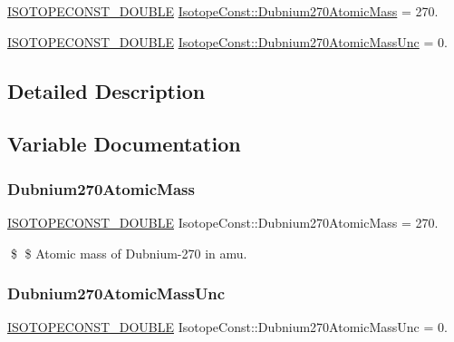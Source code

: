 \begin{DoxyCompactItemize}
\item 
\mbox{\hyperlink{group___isotope_const-_macros_ga8f45a7272ce02c0b4c65c44636ed719a}{I\+S\+O\+T\+O\+P\+E\+C\+O\+N\+S\+T\+\_\+\+D\+O\+U\+B\+LE}} \mbox{\hyperlink{group___isotope_const-_dubnium-_db270_ga77f52fcce5a9e6da48cd60d72c65bba9}{Isotope\+Const\+::\+Dubnium270\+Atomic\+Mass}} = 270.
\item 
\mbox{\hyperlink{group___isotope_const-_macros_ga8f45a7272ce02c0b4c65c44636ed719a}{I\+S\+O\+T\+O\+P\+E\+C\+O\+N\+S\+T\+\_\+\+D\+O\+U\+B\+LE}} \mbox{\hyperlink{group___isotope_const-_dubnium-_db270_gac33462755af727dd64585b9a19922437}{Isotope\+Const\+::\+Dubnium270\+Atomic\+Mass\+Unc}} = 0.
\end{DoxyCompactItemize}


\subsection{Detailed Description}


\subsection{Variable Documentation}
\mbox{\label{group___isotope_const-_dubnium-_db270_ga77f52fcce5a9e6da48cd60d72c65bba9}} 
\subsubsection{\texorpdfstring{Dubnium270\+Atomic\+Mass}{Dubnium270AtomicMass}}
{\footnotesize\ttfamily \mbox{\hyperlink{group___isotope_const-_macros_ga8f45a7272ce02c0b4c65c44636ed719a}{I\+S\+O\+T\+O\+P\+E\+C\+O\+N\+S\+T\+\_\+\+D\+O\+U\+B\+LE}} Isotope\+Const\+::\+Dubnium270\+Atomic\+Mass = 270.}

\$ \$ Atomic mass of Dubnium-\/270 in amu. \mbox{\label{group___isotope_const-_dubnium-_db270_gac33462755af727dd64585b9a19922437}} 
\subsubsection{\texorpdfstring{Dubnium270\+Atomic\+Mass\+Unc}{Dubnium270AtomicMassUnc}}
{\footnotesize\ttfamily \mbox{\hyperlink{group___isotope_const-_macros_ga8f45a7272ce02c0b4c65c44636ed719a}{I\+S\+O\+T\+O\+P\+E\+C\+O\+N\+S\+T\+\_\+\+D\+O\+U\+B\+LE}} Isotope\+Const\+::\+Dubnium270\+Atomic\+Mass\+Unc = 0.}

